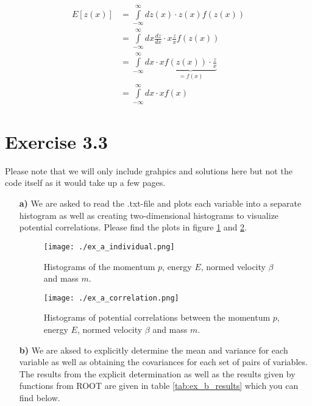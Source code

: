 \documentclass[10pt]{article}
\newenvironment{myfont}{\fontfamily{put}\selectfont}{\par}
\begin{document}
\begin{myfont}
\begin{align*}
E[z(x)] & = \int\limits_{-\infty}^{\infty} dz(x) \cdot z(x)f(z(x)) \\
     & = \int\limits_{-\infty}^{\infty} dx \frac{dz}{dx} \cdot x\frac{z}{x}f\left(z(x)\right) \\
     & = \int\limits_{-\infty}^{\infty} dx \cdot x \underbrace{f\left(z(x)\right) \cdot \frac{z}{x}}_{ = f(x)} \\
     & = \int\limits_{-\infty}^{\infty} dx \cdot x f(x)
\end{align*}


\section*{Exercise 3.3}

Please note that we will only include grahpics and solutions here but not the code itself as it would take up a few pages.

\begin{itemize}
  \item[\textbf{a)}] \label{part_a}
    We are asked to read the .txt-file and plots each variable into a separate histogram as well as creating two-dimensional histograms to visualize potential correlations.
    Please find the plots in figure \ref{fig:ex_a_individual} and \ref{fig:ex_a_correlation}.

    \begin{figure}[H]
      \centering
      \caption[]{Histograms of the momentum $p$, energy $E$, normed velocity $\beta$ and mass $m$.}
      \texttt{[image: ./ex\_a\_individual.png]}
      \label{fig:ex_a_individual}
    \end{figure}

    \begin{figure}[H]
      \centering
      \caption[]{Histograms of potential correlations between the momentum $p$, energy $E$, normed velocity $\beta$ and mass $m$.}
      \texttt{[image: ./ex\_a\_correlation.png]}
      \label{fig:ex_a_correlation}
    \end{figure}

  \item[\textbf{b)}] \label{part_b}
    We are aksed to explicitly determine the mean and variance for each variable as well as obtaining the covariances for each set of pairs of variables.
    The results from the explicit determination as well as the results given by functions from ROOT are given in table \ref{tab:ex_b_results} which you can find below.


\end{itemize}
\end{myfont}
\end{document}
